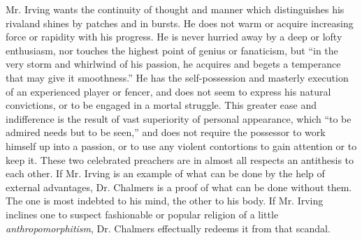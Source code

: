 Mr. Irving wants the continuity of thought and manner which
distinguishes his rival\textemdash and shines by patches and in
bursts. He does not warm or acquire increasing force or rapidity
with his progress. He is never hurried away by a deep or lofty
enthusiasm, nor touches the highest point of genius or fanaticism,
but ``in the very storm and whirlwind of his passion, he acquires
and begets a temperance that may give it smoothness.'' He has the
self-possession and masterly execution of an experienced player or
fencer, and does not seem to express his natural convictions, or
to be engaged in a mortal struggle. This greater ease and
indifference is the result of vast superiority of personal
appearance, which ``to be admired needs but to be seen,'' and does
not require the possessor to work himself up into a passion, or to
use any violent contortions to gain attention or to keep it. These
two celebrated preachers are in almost all respects an antithesis
to each other. If Mr. Irving is an example of what can be done by
the help of external advantages, Dr. Chalmers is a proof of what
can be done without them. The one is most indebted to his mind,
the other to his body. If Mr. Irving inclines one to suspect
fashionable or popular religion of a little \emph{anthropomorphitism},
Dr. Chalmers effectually redeems it from that scandal.


